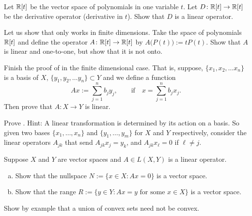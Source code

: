 \begin{exercise}
Let ${\mathbb{R}}[t]$ be the vector space of polynomials in one variable $t$.  Let
$D \colon {\mathbb{R}}[t] \to {\mathbb{R}}[t]$ be the derivative operator (derivative in $t$).
Show that $D$ is a linear operator.
\end{exercise}

\begin{exercise}
Let us show that  only works in finite
dimensions.  Take the space of polynomials ${\mathbb{R}}[t]$ and define the operator $A \colon {\mathbb{R}}[t] \to {\mathbb{R}}[t]$
by $A\bigl(P(t)\bigr) := tP(t)$.  Show that $A$ is linear and one-to-one, but
show that it is not onto.
\end{exercise}

\begin{exercise}
Finish the proof of  in the finite dimensional case.
That is, suppose,
$\{ x_1, x_2,\ldots x_n \}$ is a basis of $X$,
$\{ y_1, y_2,\ldots y_n \} \subset Y$ and we define a
function
\begin{equation*}
Ax := \sum_{j=1}^n b_j y_j, \qquad \text{if} \quad x=\sum_{j=1}^n b_j x_j .
\end{equation*}
Then prove that $A \colon X \to Y$ is linear.
\end{exercise}


\begin{exercise}
Prove .  Hint: A linear transformation is determined by
its action on a basis.  So given two bases
$\{ x_1,\ldots,x_n \}$ and
$\{ y_1,\ldots,y_m \}$ for $X$ and $Y$ respectively, consider the linear
operators $A_{jk}$ that send $A_{jk} x_j = y_k$, and 
$A_{jk} x_\ell = 0$ if $\ell \not= j$.
\end{exercise}

\begin{samepage}
\begin{exercise}[Easy]
Suppose $X$ and $Y$ are vector spaces and $A \in L(X,Y)$ is a linear
operator.
\begin{enumerate}[a)]
\item
Show that the nullspace $N := \{ x \in X : Ax = 0 \}$ is a
vector space.
\item
Show that the range $R := \{ y \in Y : Ax = y \text{ for some } x \in X \}$ is a
vector space.
\end{enumerate}
\end{exercise}
\end{samepage}

\begin{exercise}[Easy]
Show by example that a union of convex sets need not be convex.
\end{exercise}

